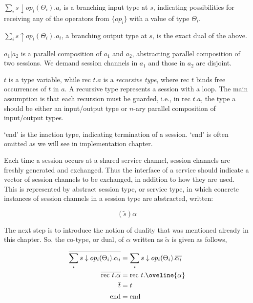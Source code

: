 \begin{compactenum}
\item $\sum_i s \downarrow op_i(\Theta_i).a_i$ is a branching input type at $s$, indicating possibilities for receiving any of the operators from $\{op_i\}$ with a value of type $\Theta_i$.

\item $\sum_i s \uparrow op_i(\Theta_i).a_i$, a branching output type at $s$, is the exact dual of the above.

\item  $a_1 | a_2$ is a parallel composition of $a_1$ and $a_2$, abstracting parallel composition of two sessions. We demand session channels in $a_1$ and those in $a_2$ are disjoint.

\item  $t$ is a type variable, while rec $t.a$ is a \textit{recursive type}, where rec $t$ binds free occurrences of $t$ in $a$. A recursive type represents a session with a loop. The main assumption is that each recursion must be guarded, i.e., in rec $t.a$, the type a should be either an input/output type or $n$-ary parallel composition of input/output types.

\item  `end' is the inaction type, indicating termination of a session. `end' is often omitted as we will see in implementation chapter.
\end{compactenum}

Each time a session occurs at a shared service channel, session channels are freshly generated and exchanged. Thus the interface of a service should indicate a vector of session channels to be exchanged, in addition to how they are used. This is represented by abstract session type, or service type, in which concrete instances of session channels in a session type are abstracted, written: 

\begin{equation}
(\tilde{s})\alpha
\end{equation}


The next step is to introduce the notion of duality that was mentioned already in this chapter. So, the co-type, or dual, of $\alpha $ written as $\tilde{\alpha }$ is given as follows,

\begin{equation}
\begin{split}
\overline{\sum_i s \downarrow op_i(\Theta_i).\alpha_i} & = \sum_i s \downarrow op_i(\Theta_i).\overline{\alpha_i} \\
\overline{\text{rec }t.\alpha} & = \text{rec }t.\oveline{\alpha} \\
\overline{t} & = t \\
\overline{\text{end}} & = \text{end}
\end{split}
\end{equation}

